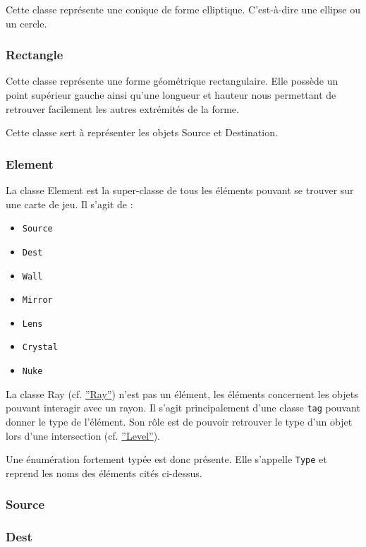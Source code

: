 \documentclass[]{article}
\begin{document}
Cette classe représente une conique de forme elliptique.
C'est-à-dire une ellipse ou un cercle.

\subsubsection{Rectangle}

Cette classe représente une forme géométrique rectangulaire.
Elle possède un point supérieur gauche ainsi qu'une longueur et hauteur 
nous permettant de retrouver facilement les autres extrémités de la 
forme.

Cette classe sert à représenter les objets Source et Destination.

\subsubsection{Element}

La classe Element est la super-classe de tous les éléments pouvant
se trouver sur une carte de jeu.
Il s'agit de :

\begin{itemize}
    \item \texttt{Source}
    \item \texttt{Dest}
    \item \texttt{Wall}
    \item \texttt{Mirror}
    \item \texttt{Lens}
    \item \texttt{Crystal}
    \item \texttt{Nuke}
\end{itemize}

La classe Ray (cf. \hyperref[Ray]{''Ray''}) n’est pas un élément, les éléments concernent 
les objets pouvant interagir avec un rayon.
Il s'agit principalement d'une classe \texttt{tag} pouvant
donner le type de l'élément. Son rôle est de pouvoir retrouver
le type d'un objet lors d'une intersection (cf. \hyperref[Level]{''Level''}).

Une énumération fortement typée est donc présente. Elle s'appelle
\texttt{Type} et reprend les noms des éléments cités ci-dessus.
    
\subsubsection{Source}




\subsubsection{Dest}
\end{document}
